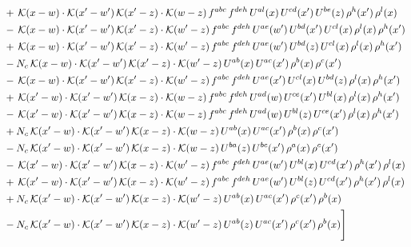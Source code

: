 \documentclass[9pt]{article}
\numberwithin{equation}{section}
\begin{document}
\begin{align}
& +\,\mathcal{K}(x-w)\cdot\mathcal{K}(x'-w')\,\mathcal{K}(x'-z)\cdot\mathcal{K}(w-z)\,f^{abc}\,f^{deh}\,U^{al}(x)\,U^{cd}(x')\,U^{be}(z)\,\rho^{h}(x')\,\rho^{l}(x)\notag\\
& -\,\mathcal{K}(x-w)\cdot\mathcal{K}(x'-w')\,\mathcal{K}(x'-z)\cdot\mathcal{K}(w'-z)\,f^{abc}\,f^{deh}\,U^{ae}(w')\,U^{bd}(x')\,U^{cl}(x)\,\rho^{l}(x)\,\rho^{h}(x')\notag\\
& +\,\mathcal{K}(x-w)\cdot\mathcal{K}(x'-w')\,\mathcal{K}(x'-z)\cdot\mathcal{K}(w'-z)\,f^{abc}\,f^{deh}\,U^{ae}(w')\,U^{bd}(z)\,U^{cl}(x)\,\rho^{l}(x)\,\rho^{h}(x')\notag\\
& -N_{c}\,\mathcal{K}(x-w)\cdot\mathcal{K}(x'-w')\,\mathcal{K}(x'-z)\cdot\mathcal{K}(w'-z)\,U^{ab}(x)\,U^{ac}(x')\,\rho^{b}(x)\,\rho^{c}(x')\notag\\
& -\,\mathcal{K}(x-w)\cdot\mathcal{K}(x'-w')\,\mathcal{K}(x'-z)\cdot\mathcal{K}(w'-z)\,f^{abc}\,f^{deh}\,U^{ae}(x')\,U^{cl}(x)\,U^{bd}(z)\,\rho^{l}(x)\,\rho^{h}(x')\notag\\
& +\,\mathcal{K}(x'-w)\cdot\mathcal{K}(x'-w')\,\mathcal{K}(x-z)\cdot\mathcal{K}(w-z)\,f^{abc}\,f^{deh}\,U^{ad}(w)\,U^{ce}(x')\,U^{bl}(x)\,\rho^{l}(x)\,\rho^{h}(x')\notag\\
& -\,\mathcal{K}(x'-w)\cdot\mathcal{K}(x'-w')\,\mathcal{K}(x-z)\cdot\mathcal{K}(w-z)\,f^{abc}\,f^{deh}\,U^{ad}(w)\,U^{bl}(z)\,U^{ce}(x')\,\rho^{l}(x)\,\rho^{h}(x')\notag\\
& +N_{c}\,\mathcal{K}(x'-w)\cdot\mathcal{K}(x'-w')\,\mathcal{K}(x-z)\cdot\mathcal{K}(w-z)\,U^{ab}(x)\,U^{ac}(x')\,\rho^{b}(x)\,\rho^{c}(x')\notag\\
& -N_{c}\,\mathcal{K}(x'-w)\cdot\mathcal{K}(x'-w')\,\mathcal{K}(x-z)\cdot\mathcal{K}(w-z)\,U^{ba}(z)\,U^{bc}(x')\,\rho^{a}(x)\,\rho^{c}(x')\notag\\
& -\,\mathcal{K}(x'-w)\cdot\mathcal{K}(x'-w')\,\mathcal{K}(x-z)\cdot\mathcal{K}(w'-z)\,f^{abc}\,f^{deh}\,U^{ae}(w')\,U^{bl}(x)\,U^{cd}(x')\,\rho^{h}(x')\,\rho^{l}(x)\notag\\
& +\,\mathcal{K}(x'-w)\cdot\mathcal{K}(x'-w')\,\mathcal{K}(x-z)\cdot\mathcal{K}(w'-z)\,f^{abc}\,f^{deh}\,U^{ae}(w')\,U^{bl}(z)\,U^{cd}(x')\,\rho^{h}(x')\,\rho^{l}(x)\notag\\
& +N_{c}\,\mathcal{K}(x'-w)\cdot\mathcal{K}(x'-w')\,\mathcal{K}(x-z)\cdot\mathcal{K}(w'-z)\,U^{ab}(x)\,U^{ac}(x')\,\rho^{c}(x')\,\rho^{b}(x)\notag\\
& -N_{c}\,\mathcal{K}(x'-w)\cdot\mathcal{K}(x'-w')\,\mathcal{K}(x-z)\cdot\mathcal{K}(w'-z)\,U^{ab}(z)\,U^{ac}(x')\,\rho^{c}(x')\,\rho^{b}(x)\Bigg]
\end{align}
\end{document}
